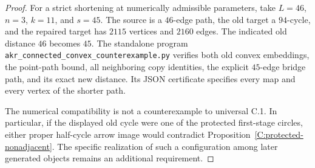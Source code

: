 \begin{proof}
For a strict shortening at numerically admissible parameters, take
$L=46$, $n=3$, $k=11$, and $s=45$. The source is a $46$-edge path,
the old target a $94$-cycle, and the repaired target has $2115$
vertices and $2160$ edges. The indicated old distance $46$ becomes
$45$. The standalone program
\texttt{akr\_connected\_convex\_counterexample.py} verifies both
old convex embeddings, the point-path bound, all neighboring copy
identities, the explicit $45$-edge bridge path, and its exact new
distance. Its JSON certificate specifies every map and every vertex
of the shorter path.

The numerical compatibility is not a counterexample to universal
C.1. In particular, if the displayed old cycle were one of the
protected first-stage circles, either proper half-cycle arrow image
would contradict Proposition~\ref{C:protected-nonadjacent}. The
specific realization of such a configuration among later generated
objects remains an additional requirement.
\end{proof}
